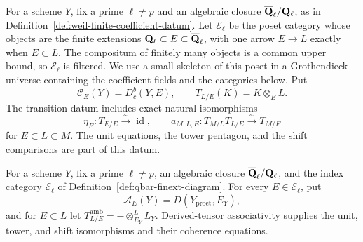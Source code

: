 
\begin{definition}
\label{def:qbar-finext-diagram}


For a scheme \(Y\), fix a prime \(\ell\neq p\) and an algebraic closure
\(\overline{\mathbf Q}_\ell/\mathbf Q_{\ell}\), as in
Definition~\ref{def:weil-finite-coefficient-datum}.
Let \(\mathcal E_\ell\) be the poset category whose objects are the finite
extensions \(\mathbf Q_{\ell}\subset E\subset\overline{\mathbf Q}_\ell\), with one arrow \(E\to L\) exactly
when \(E\subset L\).  The compositum of finitely many objects is a common
upper bound, so \(\mathcal E_\ell\) is filtered.  We use a small skeleton of
this poset in a Grothendieck universe containing the coefficient fields and
the categories below.  Put
\[
 \mathcal C_E(Y)=D^b_c(Y,E),
 \qquad
 T_{L/E}(K)=K\otimes_E L.
\]
The transition datum includes exact natural isomorphisms
\[
 \eta_E:T_{E/E}\xrightarrow{\sim}\operatorname{id},
 \qquad
 a_{M,L,E}:T_{M/L}T_{L/E}\xrightarrow{\sim}T_{M/E}
\]
for \(E\subset L\subset M\).  The unit equations, the tower pentagon, and
the shift comparisons are part of this datum.
\end{definition}


\begin{definition}
\label{def:qbar-ambient-finext-diagram}


For a scheme \(Y\), fix a prime \(\ell\neq p\), an algebraic closure
\(\overline{\mathbf Q}_\ell/\mathbf Q_{\ell}\), and the index category \(\mathcal E_\ell\) of
Definition~\ref{def:qbar-finext-diagram}.  For every
\(E\in\mathcal E_\ell\), put
\[
 \mathcal A_E(Y)=D(Y_{\mathrm{proet}},E_Y),
\]
and for \(E\subset L\) let
\(T^{\mathrm{amb}}_{L/E}=-\otimes^L_{E_Y}L_Y\).  Derived-tensor
associativity supplies the unit, tower, and shift isomorphisms and their
coherence equations.
\end{definition}


